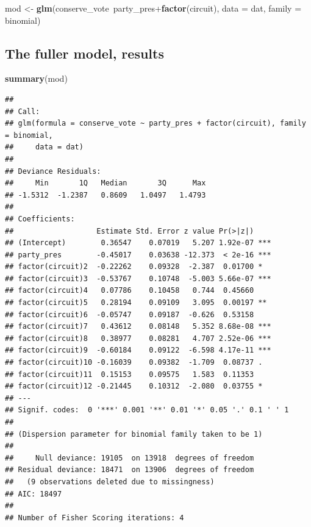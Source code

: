\documentclass[12pt,twoside]{article}
\newenvironment{Shaded}{}{}
\newcommand{\KeywordTok}[1]{\textcolor[rgb]{0.00,0.44,0.13}{\textbf{{#1}}}}
\newcommand{\DataTypeTok}[1]{\textcolor[rgb]{0.56,0.13,0.00}{{#1}}}
\newcommand{\StringTok}[1]{\textcolor[rgb]{0.25,0.44,0.63}{{#1}}}
\newcommand{\NormalTok}[1]{{#1}}
\begin{document}
\begin{Shaded}
\begin{Highlighting}[]
\NormalTok{mod <-}\StringTok{ }\KeywordTok{glm}\NormalTok{(conserve_vote~party_pres+}\KeywordTok{factor}\NormalTok{(circuit),}
           \DataTypeTok{data =} \NormalTok{dat,}
           \DataTypeTok{family =} \NormalTok{binomial)}
\end{Highlighting}
\end{Shaded}

\subsection{The fuller model, results}\label{the-fuller-model-results}

\tiny

\begin{Shaded}
\begin{Highlighting}[]
\KeywordTok{summary}\NormalTok{(mod)}
\end{Highlighting}
\end{Shaded}

\begin{verbatim}
## 
## Call:
## glm(formula = conserve_vote ~ party_pres + factor(circuit), family = binomial, 
##     data = dat)
## 
## Deviance Residuals: 
##     Min       1Q   Median       3Q      Max  
## -1.5312  -1.2387   0.8609   1.0497   1.4793  
## 
## Coefficients:
##                   Estimate Std. Error z value Pr(>|z|)    
## (Intercept)        0.36547    0.07019   5.207 1.92e-07 ***
## party_pres        -0.45017    0.03638 -12.373  < 2e-16 ***
## factor(circuit)2  -0.22262    0.09328  -2.387  0.01700 *  
## factor(circuit)3  -0.53767    0.10748  -5.003 5.66e-07 ***
## factor(circuit)4   0.07786    0.10458   0.744  0.45660    
## factor(circuit)5   0.28194    0.09109   3.095  0.00197 ** 
## factor(circuit)6  -0.05747    0.09187  -0.626  0.53158    
## factor(circuit)7   0.43612    0.08148   5.352 8.68e-08 ***
## factor(circuit)8   0.38977    0.08281   4.707 2.52e-06 ***
## factor(circuit)9  -0.60184    0.09122  -6.598 4.17e-11 ***
## factor(circuit)10 -0.16039    0.09382  -1.709  0.08737 .  
## factor(circuit)11  0.15153    0.09575   1.583  0.11353    
## factor(circuit)12 -0.21445    0.10312  -2.080  0.03755 *  
## ---
## Signif. codes:  0 '***' 0.001 '**' 0.01 '*' 0.05 '.' 0.1 ' ' 1
## 
## (Dispersion parameter for binomial family taken to be 1)
## 
##     Null deviance: 19105  on 13918  degrees of freedom
## Residual deviance: 18471  on 13906  degrees of freedom
##   (9 observations deleted due to missingness)
## AIC: 18497
## 
## Number of Fisher Scoring iterations: 4
\end{verbatim}
\end{document}
